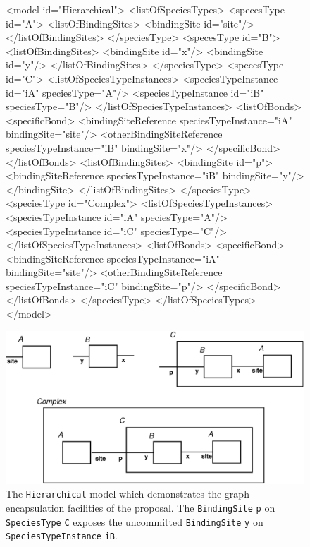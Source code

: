 \documentclass{cekarticle}
\begin{document}
\begin{figure}

\begin{example}
<model id="Hierarchical">
    <listOfSpeciesTypes>
        <specesType id="A">
            <listOfBindingSites>
                <bindingSite id="site"/>
            </listOfBindingSites>
        </speciesType>
        <specesType id="B">
            <listOfBindingSites>
                <bindingSite id="x"/>
                <bindingSite id="y"/>
            </listOfBindingSites>
        </speciesType>
        <specesType id="C">
            <listOfSpeciesTypeInstances>
                <speciesTypeInstance id="iA" speciesType="A"/>
                <speciesTypeInstance id="iB" speciesType="B"/>
            </listOfSpeciesTypeInstances>
            <listOfBonds>
                <specificBond>
                    <bindingSiteReference speciesTypeInstance="iA" bindingSite="site"/>
                    <otherBindingSiteReference speciesTypeInstance="iB" bindingSite="x"/>
                </specificBond>
            </listOfBonds>
            <listOfBindingSites>
                <bindingSite id="p">
                    <bindingSiteReference speciesTypeInstance="iB" bindingSite="y"/>
                </bindingSite>
            </listOfBindingSites>
        </speciesType>
        <speciesType id="Complex">
            <listOfSpeciesTypeInstances>
                <speciesTypeInstance id="iA" speciesType="A"/>
                <speciesTypeInstance id="iC" speciesType="C"/>
            </listOfSpeciesTypeInstances>
            <listOfBonds>
                <specificBond>
                    <bindingSiteReference speciesTypeInstance="iA" bindingSite="site"/>
                    <otherBindingSiteReference speciesTypeInstance="iC" bindingSite="p"/>
                </specificBond>
            </listOfBonds>
        </speciesType>
    </listOfSpeciesTypes>
</model>
\end{example}
  \vspace*{8pt}
  \centering
  \includegraphics[scale = 0.7]{hierarchial.eps}
\caption{The \texttt{Hierarchical} model which demonstrates the graph encapsulation facilities of
the proposal.  The \texttt{BindingSite} \texttt{p} on \texttt{SpeciesType} \texttt{C} exposes the
uncommitted \texttt{BindingSite} \texttt{y} on \texttt{SpeciesTypeInstance} \texttt{iB}.} 
\label{fig:hierarchial}
\end{figure}
\end{document}
